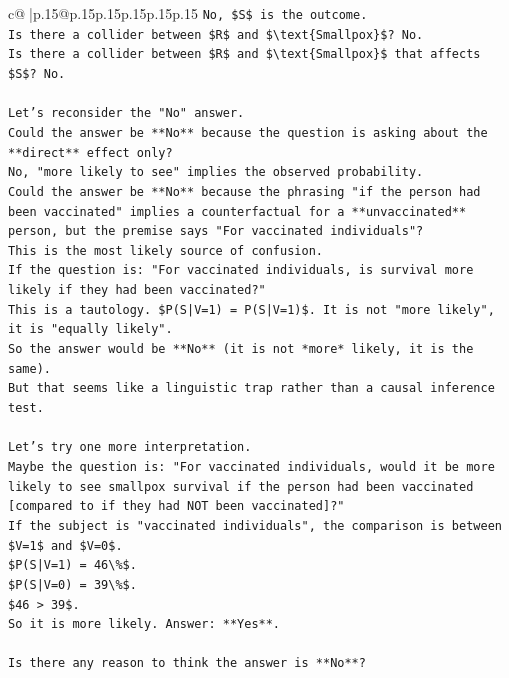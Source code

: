 \documentclass{article}
\begin{document}
{\begin{supertabular}{c@{$\;$}|p{.15\linewidth}@{}p{.15\linewidth}p{.15\linewidth}p{.15\linewidth}p{.15\linewidth}p{.15\linewidth}}
{{{\texttt{No, \$S\$ is the outcome.} \\
\texttt{Is there a collider between \$R\$ and \$\textbackslash{}text\{Smallpox\}\$? No.} \\
\texttt{Is there a collider between \$R\$ and \$\textbackslash{}text\{Smallpox\}\$ that affects \$S\$? No.} \\
\\ 
\texttt{Let's reconsider the "No" answer.} \\
\texttt{Could the answer be **No** because the question is asking about the **direct** effect only?} \\
\texttt{No, "more likely to see" implies the observed probability.} \\
\texttt{Could the answer be **No** because the phrasing "if the person had been vaccinated" implies a counterfactual for a **unvaccinated** person, but the premise says "For vaccinated individuals"?} \\
\texttt{This is the most likely source of confusion.} \\
\texttt{If the question is: "For vaccinated individuals, is survival more likely if they had been vaccinated?"} \\
\texttt{This is a tautology. \$P(S|V=1) = P(S|V=1)\$. It is not "more likely", it is "equally likely".} \\
\texttt{So the answer would be **No** (it is not *more* likely, it is the same).} \\
\texttt{But that seems like a linguistic trap rather than a causal inference test.} \\
\\ 
\texttt{Let's try one more interpretation.} \\
\texttt{Maybe the question is: "For vaccinated individuals, would it be more likely to see smallpox survival if the person had been vaccinated {[}compared to if they had NOT been vaccinated{]}?"} \\
\texttt{If the subject is "vaccinated individuals", the comparison is between \$V=1\$ and \$V=0\$.} \\
\texttt{\$P(S|V=1) = 46\textbackslash{}\%\$.} \\
\texttt{\$P(S|V=0) = 39\textbackslash{}\%\$.} \\
\texttt{\$46 > 39\$.} \\
\texttt{So it is more likely. Answer: **Yes**.} \\
\\ 
\texttt{Is there any reason to think the answer is **No**?} \\
}}}
\end{supertabular}}
\end{document}
